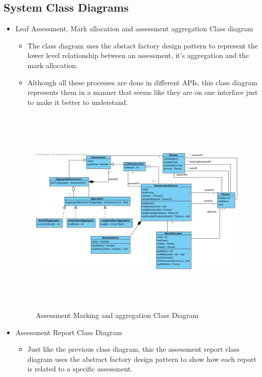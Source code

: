 \documentclass[12pt]{article}
\begin{document}
		\subsection{System Class Diagrams }%
				
				\begin{itemize}
                                        \item Leaf Assessment, Mark allocation and assessment aggregation Class diagram
                                                \begin{itemize}
                                                \item The class diagram uses the abstact factory design pattern to represent the lower level relationship between an assessment, it's aggregation and the mark allocation.
                                                \item Although all these processes are done in different APIs, this class diagram represents them in a manner that seems like they are on one interface just to make it better to understand.
                                                \end{itemize}
                                        \begin{figure}[h]
                                                \centering
                                                \includegraphics[width=6in, height=4in]{Pictures/MiniPhase2ClassDiag.jpg}
                                                \caption{Assessment Marking and aggregation Class Diagram}
					\end{figure}        
					\FloatBarrier
                                        \item Assessment Report Class Diagram
						\begin{itemize}
                                                \item Just like the previous class diagram, this the assessment report class diagram uses the abstract factory design pattern to show how each report is related to a specific assessment.      
                                                

\end{itemize}
\end{itemize}
\end{document}
